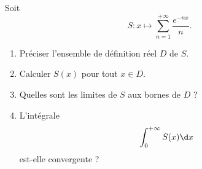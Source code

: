\begin{enonce}
\begin{exercise}[ID={RMS135 E1455},subtitle={IMT MP 2024},tags={},difficulty={}]

Soit
\begin{equation*}
S : x \mapsto \sum_{n=1}^{+\infty} \frac{e^{-nx}}{n}.
\end{equation*}

\begin{enumerate}
  \item Préciser l’ensemble de définition réel $D$ de $S$.
  \item Calculer $S(x)$ pour tout $x \in D$.
  \item Quelles sont les limites de $S$ aux bornes de $D$ ?
  \item L’intégrale
  \begin{equation*}
  \int_0^{+\infty} S(x) \d x
  \end{equation*}
  est-elle convergente ?
\end{enumerate}

\end{exercise}
\begin{solution}
\end{solution}
\end{enonce}
